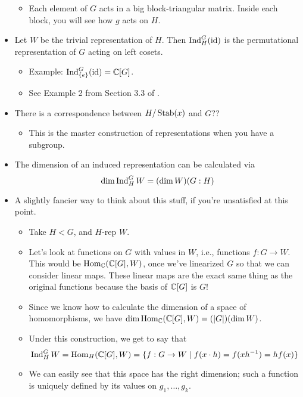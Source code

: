 \documentclass[../notes.tex]{subfiles}
\begin{document}
\begin{itemize}
\begin{itemize}
        \item Each element of $G$ acts in a big block-triangular matrix. Inside each block, you will see how $g$ acts on $H$.
    \end{itemize}
    \item Let $W$ be the trivial representation of $H$. Then $\operatorname{Ind}_H^G(\operatorname{id})$ is the permutational representation of $G$ acting on left cosets.
    \begin{itemize}
        \item Example: $\operatorname{Ind}_{\{e\}}^G(\operatorname{id})=\mathbb{C}[G]$.
        \item See Example 2 from Section 3.3 of \textcite{bib:Serre}.
    \end{itemize}
    \item There is a correspondence between $H/\operatorname{Stab}(x)$ and $G$??
    \begin{itemize}
        \item This is the master construction of representations when you have a subgroup.
    \end{itemize}
    \item The dimension of an induced representation can be calculated via
    \begin{equation*}
        \dim\operatorname{Ind}_H^GW = (\dim W)(G:H)
    \end{equation*}
    \item A slightly fancier way to think about this stuff, if you're unsatisfied at this point.
    \begin{itemize}
        \item Take $H<G$, and $H$-rep $W$.
        \item Let's look at functions on $G$ with values in $W$, i.e., functions $f:G\to W$. This would be $\operatorname{Hom}_{\mathbb{C}}(\mathbb{C}[G],W)$, once we've linearized $G$ so that we can consider linear maps. These linear maps are the exact same thing as the original functions because the basis of $\mathbb{C}[G]$ is $G$!
        \item Since we know how to calculate the dimension of a space of homomorphisms, we have $\dim\operatorname{Hom}_{\mathbb{C}}(\mathbb{C}[G],W)=(|G|)(\dim W)$.
        \item Under this construction, we get to say that
        \begin{equation*}
            \operatorname{Ind}_H^GW = \operatorname{Hom}_H(\mathbb{C}[G],W)=\{f:G\to W\mid f(x\cdot h)=f(xh^{-1})=hf(x)\}
        \end{equation*}
        \item We can easily see that this space has the right dimension; such a function is uniquely defined by its values on $g_1,\dots,g_k$.

\end{itemize}
\end{itemize}
\end{document}
